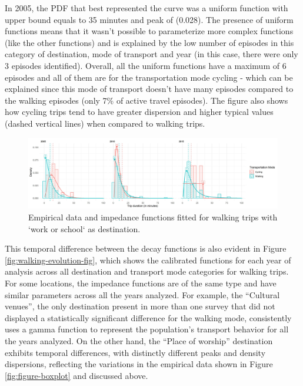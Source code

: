 \documentclass[preprint, 3p,
authoryear]{elsarticle} %
\begin{document}
In 2005, the PDF that best represented the curve was a uniform function
with upper bound equals to 35 minutes and peak of (0.028). The presence
of uniform functions means that it wasn't possible to parameterize more
complex functions (like the other functions) and is explained by the low
number of episodes in this category of destination, mode of transport
and year (in this case, there were only 3 episodes identified). Overall,
all the uniform functions have a maximum of 6 episodes and all of them
are for the transportation mode cycling - which can be explained since
this mode of transport doesn't have many episodes compared to the
walking episodes (only 7\% of active travel episodes). The figure also
shows how cycling trips tend to have greater dispersion and higher
typical values (dashed vertical lines) when compared to walking trips.

\begin{figure}

{\centering \includegraphics[width=1\linewidth]{figures/impf_Outdoors} 

}

\caption{Empirical data and impedance functions fitted for walking trips with `work or school` as destination.}\label{fig:outdoors-impedance-fig}
\end{figure}

This temporal difference between the decay functions is also evident in
Figure \ref{fig:walking-evolution-fig}, which shows the calibrated
functions for each year of analysis across all destination and transport
mode categories for walking trips. For some locations, the impedance
functions are of the same type and have similar parameters across all
the years analyzed. For example, the ``Cultural venues'', the only
destination present in more than one survey that did not displayed a
statistically significant difference for the walking mode, consistently
uses a gamma function to represent the population's transport behavior
for all the years analyzed. On the other hand, the ``Place of worship''
destination exhibits temporal differences, with distinctly different
peaks and density dispersions, reflecting the variations in the
empirical data shown in Figure \ref{fig:figure-boxplot} and discussed
above.
\end{document}
